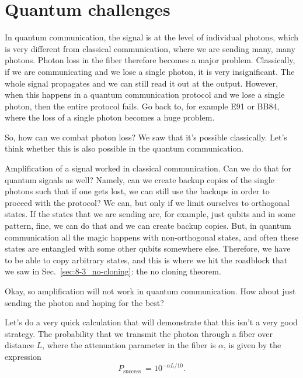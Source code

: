 \section{Quantum challenges}

In quantum communication, the signal is at the level of individual photons, which is very different from classical communication, where we are sending many, many photons. Photon loss in the fiber therefore becomes a major problem. Classically, if we are communicating and we lose a single photon, it is very insignificant. The whole signal propagates and we can still read it out at the output. However, when this happens in a quantum communication protocol and we lose a single photon, then the entire protocol fails. Go back to, for example E91 or BB84, where the loss of a single photon becomes a huge problem.

So, how can we combat photon loss? We saw that it's possible classically. Let's think whether this is also possible in the quantum communication.

Amplification of a signal worked in classical communication. Can we do that for quantum signals as well? Namely, can we create backup copies of the single photons such that if one gets lost, we can still use the backups in order to proceed with the protocol? We can, but only if we limit ourselves to orthogonal states. If the states that we are sending are, for example, just qubits \ket{} and  in some pattern, fine, we can do that and we can create backup copies. But, in quantum communication all the magic happens with non-orthogonal states, and often these states are entangled with some other qubits somewhere else. Therefore, we have to be able to copy arbitrary states, and this is where we hit the roadblock that we saw in Sec.~\ref{sec:8-3_no-cloning}: the no cloning theorem.

Okay, so amplification will not work in quantum communication. How about just sending the photon and hoping for the best?

Let's do a very quick calculation that will demonstrate that this isn't a very good strategy. The probability that we transmit the photon through a fiber over distance $L$, where the attenuation parameter in the fiber is $\alpha$, is given by the expression
\begin{equation}
P_{\text {success }}=10^{-\alpha L / 10}.
\end{equation}

